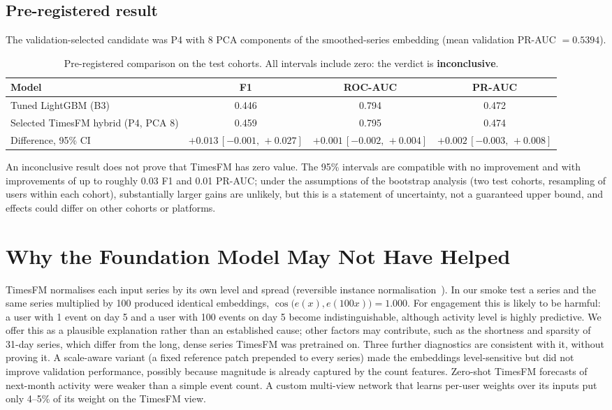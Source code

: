 \documentclass[11pt,a4paper]{article}
\newcommand{\ci}[2]{\,[#1,\,#2]}
\begin{document}
\subsection{Pre-registered result}
The validation-selected candidate was P4 with 8 PCA components of the smoothed-series embedding (mean
validation PR-AUC $=0.5394$).

\begin{table}[H]
\centering\small
\begin{tabular}{lccc}
\toprule
Model & F1 & ROC-AUC & PR-AUC\\
\midrule
Tuned LightGBM (B3) & 0.446 & 0.794 & 0.472\\
Selected TimesFM hybrid (P4, PCA 8) & 0.459 & 0.795 & 0.474\\
\midrule
Difference, 95\% CI & $+0.013\ci{-0.001}{+0.027}$ & $+0.001\ci{-0.002}{+0.004}$ & $+0.002\ci{-0.003}{+0.008}$\\
\bottomrule
\end{tabular}
\caption{Pre-registered comparison on the test cohorts. All intervals include zero: the verdict is \textbf{inconclusive}.}
\label{tab:prereg}
\end{table}
An inconclusive result does not prove that TimesFM has zero value. The 95\% intervals are compatible with no
improvement and with improvements of up to roughly 0.03 F1 and 0.01 PR-AUC; under the assumptions of the
bootstrap analysis (two test cohorts, resampling of users within each cohort), substantially larger gains are
unlikely, but this is a statement of uncertainty, not a guaranteed upper bound, and effects could differ on
other cohorts or platforms.



\section{Why the Foundation Model May Not Have Helped}\label{sec:why}
TimesFM normalises each input series by its own level and spread (reversible instance
normalisation~\citep{kim2022revin}). In our smoke test a series and the same series multiplied by 100 produced
identical embeddings, $\cos\big(e(x), e(100x)\big)=1.000$. For engagement this is likely to be harmful: a
user with 1 event on day 5 and a user with 100 events on day 5 become indistinguishable, although activity
level is highly predictive. We offer this as a plausible explanation rather than an established cause; other
factors may contribute, such as the shortness and sparsity of 31-day series, which differ from the long, dense
series TimesFM was pretrained on. Three further diagnostics are consistent with it, without proving it. A
scale-aware variant (a fixed reference patch prepended to every series) made the embeddings level-sensitive
but did not improve validation performance, possibly because magnitude is already captured by the count
features. Zero-shot TimesFM forecasts of next-month activity were weaker than a simple event count. A custom
multi-view network that learns per-user weights over its inputs put only 4--5\% of its weight on the
TimesFM view.
\end{document}
